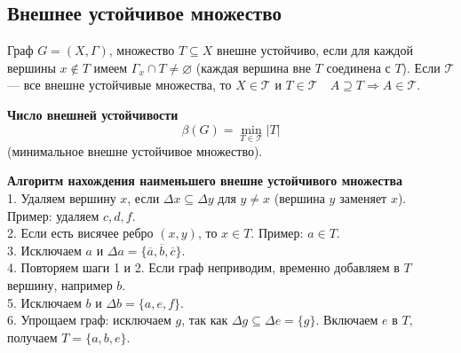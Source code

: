 \subsection{Внешнее устойчивое множество}
Граф $G = (X, \Gamma)$, множество $T \subseteq X$ внешне устойчиво, если для каждой вершины $x \notin T$ имеем $\Gamma_x \cap T \neq \varnothing$ (каждая вершина вне $T$ соединена с $T$). Если $\mathcal{T}$ — все внешне устойчивые множества, то $X \in \mathcal{T}$ и $T \in \mathcal{T} \quad A \supseteq T \Rightarrow A \in \mathcal{T}$.

\textbf{Число внешней устойчивости}
\[\beta(G) = \min_{T \in \mathcal{T}} |T|\] (минимальное внешне устойчивое множество).

\textbf{Алгоритм нахождения наименьшего внешне устойчивого множества}
\\1. Удаляем вершину $x$, если $\Delta x \subseteq \Delta y$ для $y \neq x$ (вершина $y$ заменяет $x$). Пример: удаляем $c, d, f$.
\\2. Если есть висячее ребро $(x, y)$, то $x \in T$. Пример: $a \in T$.
\\3. Исключаем $a$ и $\Delta a = \{\overline{a}, \overline{b}, \overline{c}\}$.
\\4. Повторяем шаги 1 и 2. Если граф неприводим, временно добавляем в $T$ вершину, например $b$.
\\5. Исключаем $b$ и $\Delta b = \{a, e, f\}$.
\\6. Упрощаем граф: исключаем $g$, так как $\Delta g \subseteq \Delta e = \{g\}$. Включаем $e$ в $T$, получаем $T = \{a, b, e\}$.